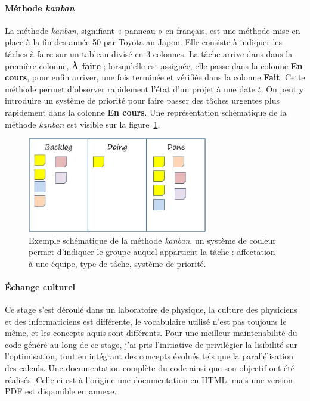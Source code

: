 			\paragraph{Méthode \emph{kanban}}
La méthode \emph{kanban}, signifiant « panneau » en français, est une méthode mise en place à la fin des année 50 par Toyota au Japon. Elle consiste à indiquer les tâches à faire sur un tableau divisé en 3 colonnes. La tâche arrive dans dans la première colonne, \textbf{À faire} ; lorsqu'elle est assignée, elle passe dans la colonne \textbf{En cours}, pour enfin arriver, une fois terminée et vérifiée dans la colonne \textbf{Fait}. Cette méthode permet d'observer rapidement l'état d'un projet à une date $t$. On peut y introduire un système de priorité pour faire passer des tâches urgentes plus rapidement dans la colonne \textbf{En cours}. Une représentation schématique de la méthode \emph{kanban} est visible sur la figure~\ref{fig:kanban}.

	\begin{figure}[h]
		\centering
		\includegraphics[width=0.7\textwidth]{img/kanban.png}
		\caption[Exemple schématique de la méthode \emph{kanban}]{Exemple schématique de la méthode \emph{kanban}, un système de couleur permet d'indiquer le groupe auquel appartient la tâche : affectation à une équipe, type de tâche, système de priorité.}
		\label{fig:kanban}
	\end{figure}

			\paragraph{Échange culturel}
Ce stage s'est déroulé dans un laboratoire de physique, la culture des physiciens et des informaticiens est différente, le vocabulaire utilisé n'est pas toujours le même, et les concepts aquis sont différents. Pour une meilleur maintenabilité du code généré au long de ce stage, j'ai pris l'initiative de privilégier la lisibilité sur l'optimisation, tout en intégrant des concepts évolués tels que la parallélisation des calculs. Une documentation complète du code ainsi que son objectif ont été réalisés. Celle-ci est à l'origine une documentation en HTML, mais une version PDF est disponible en annexe.
